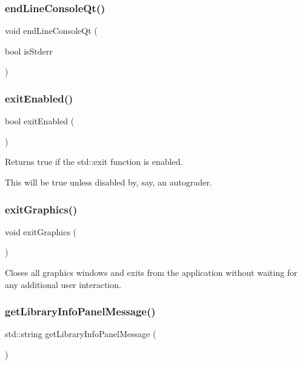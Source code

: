 \subsubsection{\texorpdfstring{end\+Line\+Console\+Qt()}{endLineConsoleQt()}}
{\footnotesize\ttfamily void end\+Line\+Console\+Qt (\begin{DoxyParamCaption}\item[{bool}]{is\+Stderr }\end{DoxyParamCaption})}

\mbox{\label{namespacesgl_a5bb1fbda6b82680cc8f04064e55a85c6}} 
\subsubsection{\texorpdfstring{exit\+Enabled()}{exitEnabled()}}
{\footnotesize\ttfamily bool exit\+Enabled (\begin{DoxyParamCaption}{ }\end{DoxyParamCaption})}



Returns true if the std\+::exit function is enabled. 

This will be true unless disabled by, say, an autograder. \mbox{\label{namespacesgl_a9a92c5a4ea24cb583276ed5abbbfdf81}} 
\subsubsection{\texorpdfstring{exit\+Graphics()}{exitGraphics()}}
{\footnotesize\ttfamily void exit\+Graphics (\begin{DoxyParamCaption}{ }\end{DoxyParamCaption})}



Closes all graphics windows and exits from the application without waiting for any additional user interaction. 

\mbox{\label{namespacesgl_a1ddb4527643468187978f5732f306ee8}} 
\subsubsection{\texorpdfstring{get\+Library\+Info\+Panel\+Message()}{getLibraryInfoPanelMessage()}}
{\footnotesize\ttfamily std\+::string get\+Library\+Info\+Panel\+Message (\begin{DoxyParamCaption}{ }\end{DoxyParamCaption})}


